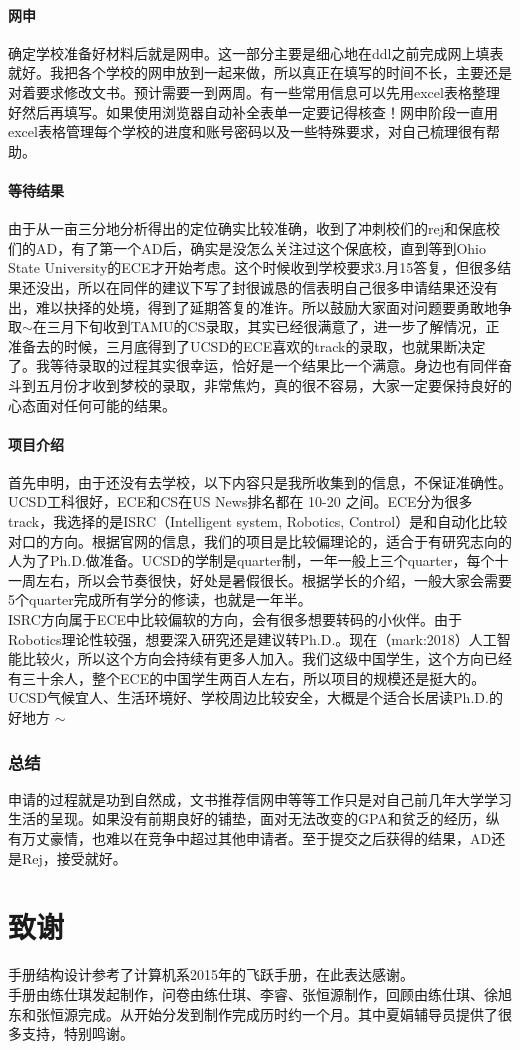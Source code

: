 \documentclass[a4paper,UTF8]{book}
\begin{document}
        \subsubsection*{网申}
        确定学校准备好材料后就是网申。这一部分主要是细心地在ddl之前完成网上填表就好。我把各个学校的网申放到一起来做，所以真正在填写的时间不长，主要还是对着要求修改文书。预计需要一到两周。有一些常用信息可以先用excel表格整理好然后再填写。如果使用浏览器自动补全表单一定要记得核查！网申阶段一直用excel表格管理每个学校的进度和账号密码以及一些特殊要求，对自己梳理很有帮助。

        \subsubsection*{等待结果}
        由于从一亩三分地分析得出的定位确实比较准确，收到了冲刺校们的rej和保底校们的AD，有了第一个AD后，确实是没怎么关注过这个保底校，直到等到Ohio State University的ECE才开始考虑。这个时候收到学校要求3.月15答复，但很多结果还没出，所以在同伴的建议下写了封很诚恳的信表明自己很多申请结果还没有出，难以抉择的处境，得到了延期答复的准许。所以鼓励大家面对问题要勇敢地争取$\sim$在三月下旬收到TAMU的CS录取，其实已经很满意了，进一步了解情况，正准备去的时候，三月底得到了UCSD的ECE喜欢的track的录取，也就果断决定了。我等待录取的过程其实很幸运，恰好是一个结果比一个满意。身边也有同伴奋斗到五月份才收到梦校的录取，非常焦灼，真的很不容易，大家一定要保持良好的心态面对任何可能的结果。

        \subsubsection*{项目介绍}
        首先申明，由于还没有去学校，以下内容只是我所收集到的信息，不保证准确性。\\
        UCSD工科很好，ECE和CS在US News排名都在 10-20 之间。ECE分为很多track，我选择的是ISRC（Intelligent system, Robotics, Control）是和自动化比较对口的方向。根据官网的信息，我们的项目是比较偏理论的，适合于有研究志向的人为了Ph.D.做准备。UCSD的学制是quarter制，一年一般上三个quarter，每个十一周左右，所以会节奏很快，好处是暑假很长。根据学长的介绍，一般大家会需要5个quarter完成所有学分的修读，也就是一年半。\\
        ISRC方向属于ECE中比较偏软的方向，会有很多想要转码的小伙伴。由于Robotics理论性较强，想要深入研究还是建议转Ph.D.。现在（mark:2018）人工智能比较火，所以这个方向会持续有更多人加入。我们这级中国学生，这个方向已经有三十余人，整个ECE的中国学生两百人左右，所以项目的规模还是挺大的。\\
        UCSD气候宜人、生活环境好、学校周边比较安全，大概是个适合长居读Ph.D.的好地方 $\sim$

    \subsection*{总结}
        申请的过程就是功到自然成，文书推荐信网申等等工作只是对自己前几年大学学习生活的呈现。如果没有前期良好的铺垫，面对无法改变的GPA和贫乏的经历，纵有万丈豪情，也难以在竞争中超过其他申请者。至于提交之后获得的结果，AD还是Rej，接受就好。



\chapter{致谢}
手册结构设计参考了计算机系2015年的飞跃手册，在此表达感谢。\\
手册由练仕琪发起制作，问卷由练仕琪、李睿、张恒源制作，回顾由练仕琪、徐旭东和张恒源完成。从开始分发到制作完成历时约一个月。其中夏娟辅导员提供了很多支持，特别鸣谢。
\end{document}
